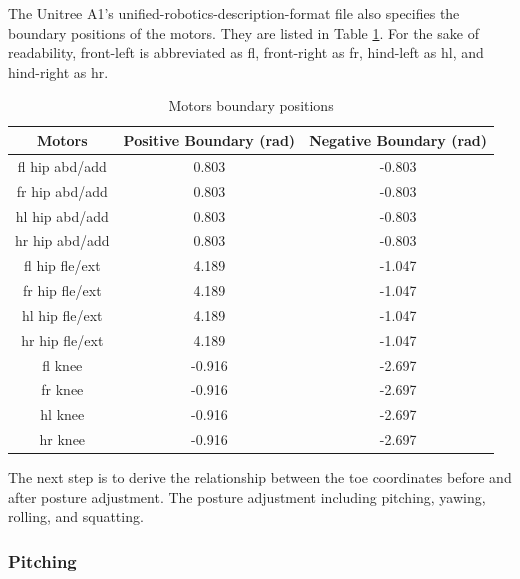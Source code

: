 

The Unitree A1's unified-robotics-description-format file also specifies the boundary positions of the motors. They are listed in Table \ref{table:motors_boundary_positions}. For the sake of readability, front-left is abbreviated as fl, front-right as fr, hind-left as hl, and hind-right as hr.

\begin{table}[htbp]\label{table:motors_boundary_positions}
   \centering
   \caption{Motors boundary positions}
   \begin{tabular}{|c|c|c|}
   \hline
   Motors & Positive Boundary (rad) & Negative Boundary (rad) \\ \hline
   fl hip abd/add &  0.803 & -0.803 \\ \hline
   fr hip abd/add &  0.803 & -0.803 \\ \hline
   hl hip abd/add &  0.803 & -0.803 \\ \hline
   hr hip abd/add &  0.803 & -0.803 \\ \hline
   fl hip fle/ext &  4.189 & -1.047 \\ \hline
   fr hip fle/ext &  4.189 & -1.047 \\ \hline
   hl hip fle/ext &  4.189 & -1.047 \\ \hline
   hr hip fle/ext &  4.189 & -1.047 \\ \hline
   fl knee        & -0.916 & -2.697 \\ \hline
   fr knee        & -0.916 & -2.697 \\ \hline
   hl knee        & -0.916 & -2.697 \\ \hline
   hr knee        & -0.916 & -2.697 \\ \hline
   \end{tabular}
\end{table}

The next step is to derive the relationship between the toe coordinates before and after posture adjustment. The posture adjustment including pitching, yawing, rolling, and squatting.

\subsubsection{Pitching}

